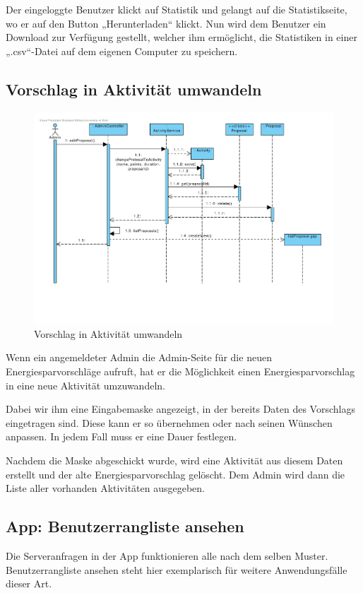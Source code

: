 Der eingeloggte Benutzer klickt auf Statistik und gelangt auf die
Statistikseite, wo er auf den Button „Herunterladen“ klickt. Nun wird
dem Benutzer ein Download zur Verfügung gestellt, welcher ihm
ermöglicht, die Statistiken in einer „.csv“-Datei auf dem eigenen
Computer zu speichern.

\subsection{Vorschlag in Aktivität umwandeln}

\begin{figure}[H]
  \centering
  \includegraphics[width=\textwidth, clip]{gfx/vorschlag_in_aktivitaet_umwandeln}
  \caption{Vorschlag in Aktivität umwandeln}
\end{figure}

Wenn ein angemeldeter Admin die Admin-Seite für die neuen Energiesparvorschläge aufruft, hat er die Möglichkeit einen Energiesparvorschlag in eine neue Aktivität umzuwandeln.

Dabei wir ihm eine Eingabemaske angezeigt, in der bereits Daten des Vorschlags eingetragen sind. Diese kann er so übernehmen oder nach seinen Wünschen anpassen. In jedem Fall muss er eine Dauer festlegen.

Nachdem die Maske abgeschickt wurde, wird eine Aktivität aus diesem Daten erstellt und der alte Energiesparvorschlag gelöscht. Dem Admin wird dann die Liste aller vorhanden Aktivitäten ausgegeben.



\subsection{App: Benutzerrangliste ansehen}
Die Serveranfragen in der App funktionieren alle nach dem selben
Muster. Benutzerrangliste ansehen steht hier exemplarisch für weitere
Anwendungsfälle dieser Art.

